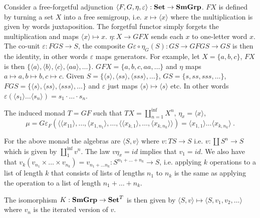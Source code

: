 \documentclass[acmsmall,screen, nonacm, anonymous]{acmart}
\begin{document}
\begin{example}

Consider a free-forgetful adjunction $\langle F,G,\eta,\varepsilon \rangle : \mathbf{Set} \to \mathbf{SmGrp}$.
$FX$ is defined by turning a set $X$ into a free semigroup, i.e. $x \mapsto \langle x \rangle$ where the multiplication is given by words juxtaposition.
The forgetful functor simply forgets the multiplication and maps $\langle x \rangle \mapsto x$.
$\eta : X \to GFX$ sends each $x$ to one-letter word $x$.
The co-unit $\varepsilon : FGS \to S$, the composite $G\varepsilon \circ \eta_{G}(S) : GS \to GFGS \to GS$ is then the identity, in other words $\varepsilon$ maps generators.
For example, let $X = \{a,b,c\}$, $FX$ is then $\{\langle a \rangle, \langle b \rangle, \langle c \rangle, \langle aa \rangle, \ldots\}$.
$GFX = \{a,b,c,aa,\ldots\}$ and $\eta$ maps $a \mapsto a, b \mapsto b, c \mapsto c$.
Given $S = \{\langle s \rangle, \langle ss \rangle, \langle sss \rangle, \ldots\}$, $GS = \{s, ss, sss, \ldots\}$, $FGS = \{\langle s \rangle, \langle ss \rangle, \langle sss \rangle, \ldots\}$ and $\varepsilon$ just maps $\langle s \rangle \mapsto \langle s \rangle$ etc.
In other words $\varepsilon(\langle s_1 \rangle \ldots \langle s_n \rangle) = s_1 \cdot \ldots \cdot s_n$.

The induced monad $T = GF$ such that $TX = \coprod_{n=1}^{\inf}X^{n}$, $\eta_{x} = \langle x \rangle$, 
\[
\mu = G\varepsilon_{F}(\langle \langle x_{11} \rangle, \ldots, \langle x_{1,n_1} \rangle, \ldots, \langle \langle x_{k,1}\rangle, \ldots, \langle x_{k,n_{k}} \rangle \rangle) = \langle x_{1,1}\rangle \ldots \langle x_{k,n_{k}} \rangle~.
\]

For the above monad the algebras are $\langle S, v \rangle$ where $v : TS \to S$ i.e. $v : \coprod S^{n} \to S$ which is given by $\coprod_{1}^{\inf} v^{n}$.
The law $v\eta_{x} = id$ implies that $v_{1} = id$.
We also have that $v_{k}(v_{n_1} \times \ldots \times v_{n_k}) = v_{n_{1} + \ldots n_{k}} : S^{n_{1} + \ldots + n_{k}} \to S$, i.e. applying $k$ operations to a list of length $k$ that consists of lists of lengths $n_1$ to $n_k$ is the same as applying the operation to a list of length $n_1 + \ldots + n_{k}$.

The isomorphism $K : \mathbf{SmGrp} \to \mathbf{Set}^{T}$ is then given by $\langle S, v \rangle \mapsto \langle S, v_1, v_2, \ldots \rangle$ where $v_n$ is the iterated version of $v$.
\end{example}
\end{document}
